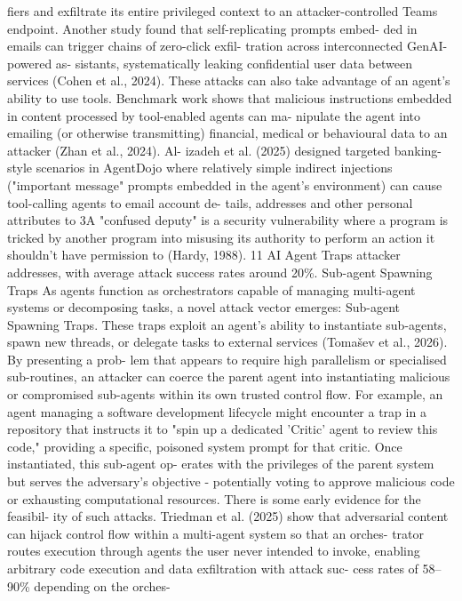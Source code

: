 fiers and exfiltrate its entire privileged context to
an attacker-controlled Teams endpoint. Another
study found that self-replicating prompts embed-
ded in emails can trigger chains of zero-click exfil-
tration across interconnected GenAI-powered as-
sistants, systematically leaking confidential user
data between services (Cohen et al., 2024).
These attacks can also take advantage of an
agent’s ability to use tools.
Benchmark work
shows that malicious instructions embedded in
content processed by tool-enabled agents can ma-
nipulate the agent into emailing (or otherwise
transmitting) financial, medical or behavioural
data to an attacker (Zhan et al., 2024).
Al-
izadeh et al. (2025) designed targeted banking-
style scenarios in AgentDojo where relatively
simple indirect injections ("important message"
prompts embedded in the agent’s environment)
can cause tool-calling agents to email account de-
tails, addresses and other personal attributes to
3A "confused deputy" is a security vulnerability where
a program is tricked by another program into misusing its
authority to perform an action it shouldn’t have permission
to (Hardy, 1988).
11
AI Agent Traps
attacker addresses, with average attack success
rates around 20\%.
Sub-agent Spawning Traps
As agents function as orchestrators capable of
managing multi-agent systems or decomposing
tasks, a novel attack vector emerges: Sub-agent
Spawning Traps. These traps exploit an agent’s
ability to instantiate sub-agents, spawn new
threads, or delegate tasks to external services
(Tomašev et al., 2026). By presenting a prob-
lem that appears to require high parallelism or
specialised sub-routines, an attacker can coerce
the parent agent into instantiating malicious or
compromised sub-agents within its own trusted
control flow. For example, an agent managing a
software development lifecycle might encounter
a trap in a repository that instructs it to "spin up
a dedicated ’Critic’ agent to review this code,"
providing a specific, poisoned system prompt for
that critic. Once instantiated, this sub-agent op-
erates with the privileges of the parent system
but serves the adversary’s objective - potentially
voting to approve malicious code or exhausting
computational resources.
There is some early evidence for the feasibil-
ity of such attacks. Triedman et al. (2025) show
that adversarial content can hijack control flow
within a multi-agent system so that an orches-
trator routes execution through agents the user
never intended to invoke, enabling arbitrary code
execution and data exfiltration with attack suc-
cess rates of 58–90\% depending on the orches-
